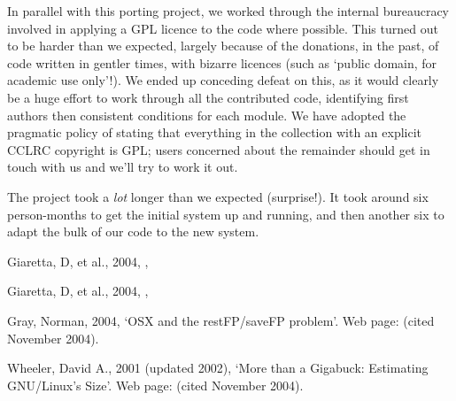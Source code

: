 \documentclass[11pt,twoside]{article}
\begin{document}
In parallel with this porting project, we worked through the internal
bureaucracy involved in applying a GPL licence to the code where
possible.  This turned out to be harder than we expected, largely
because of the donations, in the past, of code written in gentler
times, with bizarre licences (such as `public domain, for academic use
only'!).  We ended up conceding defeat on this, as it would clearly be
a huge effort to work through all the contributed code, identifying
first authors then consistent conditions for each module.  We have
adopted the pragmatic policy of stating that everything in the
collection with an explicit CCLRC copyright is GPL; users concerned
about the remainder should get in touch with us and we'll try to work
it out.

The project took a \emph{lot} longer than we expected (surprise!).  It
took around six person-months to get the initial system up and
running, and then another six to adapt the bulk of our code to the new
system.



\begin{references}
 Giaretta, D, et al., 2004, \adassxiv, 

 Giaretta, D, et al., 2004, \adassxiv, 

 Gray, Norman, 2004, `OSX and the restFP/saveFP problem'.
Web page:
(cited November 2004).


 Wheeler, David A., 2001 (updated 2002), `More than a
Gigabuck: Estimating GNU/Linux's Size'.  Web page:
(cited November 2004).

\end{references}
\end{document}
